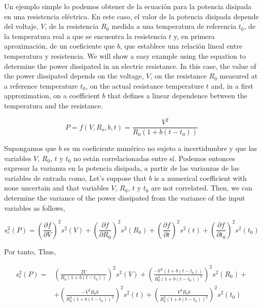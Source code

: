 \begin{paracol}{2}
Un ejemplo simple lo podemos obtener de la ecuación para la potencia disipada en una resistencia eléctrica. En este caso, el valor de la potencia disipada depende del voltaje, $V$, de la resistencia $R_0$ medida a una temperatura de referencia $t_0$, de la temperatura real a que se encuentra la resistencia $t$ y, en primera aproximación, de un coeficiente que $b$, que establece una relación lineal entre temperatura y resistencia.
\switchcolumn
We will show a easy example using the equation to determine the power dissipated in an electric resistance. In this case, the value of the power dissipated depends on the voltage, $V$, on the resistance $R_0$ measured at a reference temperature $t_0$, on the actual resistance temperature $t$ and, in a first approximation, on a coefficient $b$ that defines a linear dependence between the temperatura and the resistance.    
\end{paracol}
\begin{equation*}
P = f(V,R_o,b,t) = \frac{V^2}{R_0\left(1+b(t-t_0)\right)}
\end{equation*}
\begin{paracol}{2}
Supongamos que $b$ es un coeficiente numérico no sujeto a incertidumbre y que las  variables $V$, $R_0$, $t$ y $t_0$ no están correlacionadas entre sí. Podemos entonces expresar la varianza  en la  potencia disipada, a partir de las varianzas de las variables de entrada como,
\switchcolumn
Let's suppose that $b$ is a numerical coefficient with none uncertain and that variables $V$, $R_0$, $t$ y $t_0$ are not correlated. Then, we can determine the variance of the power dissipated from the variance of the input variables as follows,
\end{paracol}
\begin{equation*}
s_c^2(P) = \left(\frac{\partial f}{\partial V}\right)^2 s^2(V)+ \left(\frac{\partial f}{\partial R_0}\right)^2 s^2(R_0)+ \left(\frac{\partial f}{\partial t}\right)^2 s^2(t)+\left(\frac{\partial f}{\partial t_0}\right)^2 s^2(t_0)    
\end{equation*}
\begin{paracol}{2}
Por tanto,
\switchcolumn
Thus,
\end{paracol}
\begin{align*}
s_c^2(P) =& \left(\frac{2V}{R_0\left(1+b(t-t_0)\right)}\right)^2 s^2(V)+ \left(\frac{-V^2\left(1+b(t-t_0)\right)}{R_0^2\left(1+b(t-t_0)\right)^2}\right)^2 s^2(R_0)+\\
&+ \left(\frac{-V^2R_0b}{R_0^2\left(1+b(t-t_0)\right)^2}\right)^2 s^2(t)+\left(\frac{V^2R_0b}{R_0^2\left(1+b(t-t_0)\right)^2}\right)^2 s^2(t_0)    
\end{align*}
